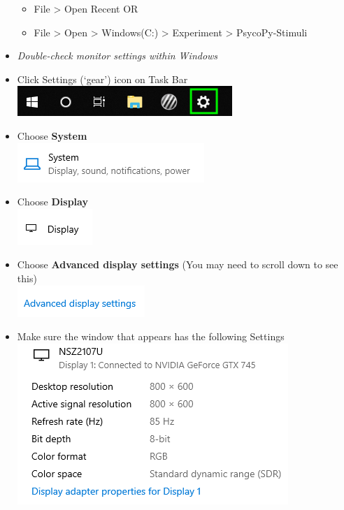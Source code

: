 \documentclass[]{article}
\providecommand{\tightlist}{%
  \setlength{\itemsep}{0pt}\setlength{\parskip}{0pt}}
\begin{document}
\begin{itemize}
  \begin{itemize}
  \tightlist
  \item
    File \textgreater{} Open Recent OR\\
  \item
    File \textgreater{} Open \textgreater{} Windows(C:) \textgreater{}
    Experiment \textgreater{} PsycoPy-Stimuli
  \end{itemize}
\item
  \emph{Double-check monitor settings within Windows}
\item
  Click Settings (`gear') icon on Task Bar
  \includegraphics{images/DispSettings-1.PNG}\\
\item
  Choose \textbf{System}\\
  \includegraphics{images/DS2.PNG}\\
\item
  Choose \textbf{Display}\\
  \includegraphics{images/ds3.PNG}\\
\item
  Choose \textbf{Advanced display settings} (You may need to scroll down
  to see this)\\
  \includegraphics{images/DS4.PNG}\\
\item
  Make sure the window that appears has the following Settings\\
  \includegraphics{images/ds5.PNG}\\

\end{itemize}
\end{document}
